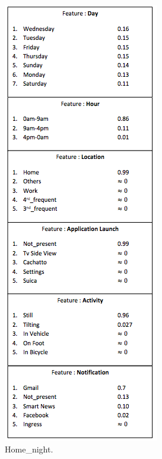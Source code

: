 \begin{figure}[t!]
    \centering
    \begin{subfigure}[t]{0.33\textwidth}
        \centering
        \includegraphics[scale=0.5]{Figures/Home.png}
        \caption{Home\_night.}
    \end{subfigure}%
    \begin{subfigure}[t]{0.33\textwidth}
        \centering

\end{subfigure}
\end{figure}
